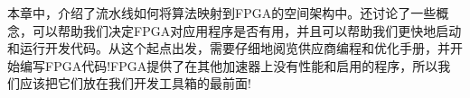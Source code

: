 
本章中，介绍了流水线如何将算法映射到FPGA的空间架构中。还讨论了一些概念，可以帮助我们决定FPGA对应用程序是否有用，并且可以帮助我们更快地启动和运行开发代码。从这个起点出发，需要仔细地阅览供应商编程和优化手册，并开始编写FPGA代码!FPGA提供了在其他加速器上没有性能和启用的程序，所以我们应该把它们放在我们开发工具箱的最前面!\par


\newpage